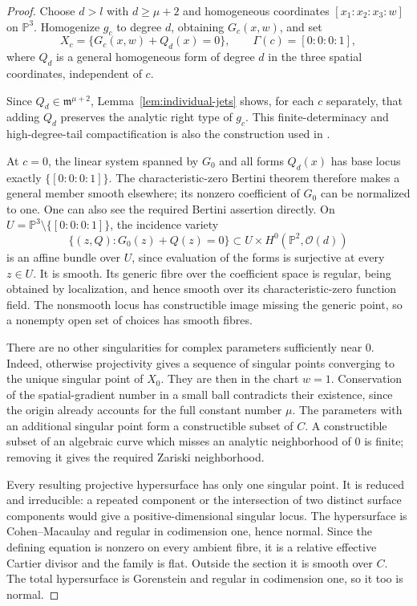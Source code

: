 \begin{proof}
Choose $d>l$ with $d\geq\mu+2$ and homogeneous coordinates
$[x_1:x_2:x_3:w]$ on $\mathbb P^3$.  Homogenize $g_c$ to degree $d$,
obtaining $G_c(x,w)$, and set
\[
 X_c=\{G_c(x,w)+Q_d(x)=0\},
 \qquad \Gamma(c)=[0:0:0:1],
\]
where $Q_d$ is a general homogeneous form of degree $d$ in the three
spatial coordinates, independent of $c$.

Since $Q_d\in\mathfrak m^{\mu+2}$, Lemma~\ref{lem:individual-jets}
shows, for each $c$ separately, that adding $Q_d$ preserves the analytic
right type of $g_c$.  This finite-determinacy and high-degree-tail
compactification is also the construction used in
\cite[Lemma~2.5]{Steenbrink1985}.

At $c=0$, the linear system spanned by $G_0$ and all forms $Q_d(x)$
has base locus exactly $\{[0:0:0:1]\}$.  The characteristic-zero
Bertini theorem \cite[Theorem~4.1]{KleimanBertini} therefore makes a
general member smooth elsewhere;
its nonzero coefficient of $G_0$ can be normalized to one.  One can
also see the required Bertini assertion directly.  On
$U=\mathbb P^3\setminus\{[0:0:0:1]\}$, the incidence variety
\[
 \{(z,Q):G_0(z)+Q(z)=0\}\subset U\times H^0(\mathbb P^2,\mathcal O(d))
\]
is an affine bundle over $U$, since evaluation of the forms is
surjective at every $z\in U$.  It is smooth.  Its generic fibre over
the coefficient space is regular, being obtained by localization, and
hence smooth over its characteristic-zero function field.  The
nonsmooth locus has constructible image missing the generic point,
so a nonempty open set of choices has smooth fibres.

There are no other singularities for complex parameters sufficiently
near $0$.  Indeed, otherwise projectivity gives a sequence of singular
points converging to the unique singular point of $X_0$.  They are then
in the chart $w=1$.  Conservation of the spatial-gradient number in a
small ball contradicts their existence, since the origin already
accounts for the full constant number $\mu$.  The parameters with an
additional singular point form a constructible subset of $C$.  A
constructible subset of an algebraic curve which misses an analytic
neighborhood of $0$ is finite; removing it gives the required Zariski
neighborhood.

Every resulting projective hypersurface has only one singular point.
It is reduced and irreducible: a repeated component or the intersection
of two distinct surface components would give a positive-dimensional
singular locus.  The hypersurface is Cohen--Macaulay and regular in
codimension one, hence normal.  Since the defining equation is nonzero
on every ambient fibre, it is a relative effective Cartier divisor and
the family is flat.  Outside the section it is smooth over $C$.
The total hypersurface is Gorenstein and regular in codimension one,
so it too is normal.


\end{proof}
